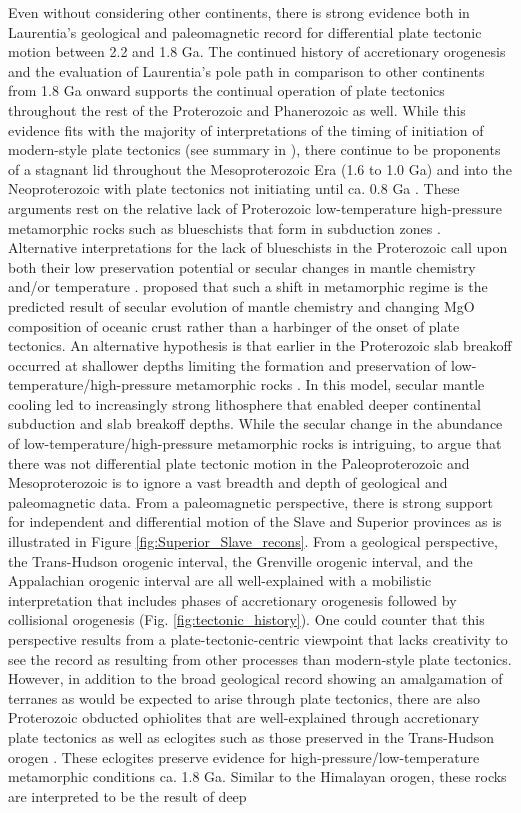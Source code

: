 \documentclass[twocolumn, switch]{article} %
\begin{document}
Even without considering other continents, there is strong evidence both in Laurentia's geological and paleomagnetic record for differential plate tectonic motion between 2.2 and 1.8 Ga. The continued history of accretionary orogenesis and the evaluation of Laurentia's pole path in comparison to other continents from 1.8 Ga onward supports the continual operation of plate tectonics throughout the rest of the Proterozoic and Phanerozoic as well. While this evidence fits with the majority of interpretations of the timing of initiation of modern-style plate tectonics (see summary in \citealp{Korenaga2013a}), there continue to be proponents of a stagnant lid throughout the Mesoproterozoic Era (1.6 to 1.0 Ga) and into the Neoproterozoic  with plate tectonics not initiating until ca. 0.8 Ga \citep{Hamilton2011a, Stern2018a}. These arguments rest on the relative lack of Proterozoic low-temperature high-pressure metamorphic rocks such as blueschists that form in subduction zones \citep{Stern2013a}. Alternative interpretations for the lack of blueschists in the Proterozoic call upon both their low preservation potential or secular changes in mantle chemistry and/or temperature \citep{Brown2019a}. \cite{Palin2015a} proposed that such a shift in metamorphic regime is the predicted result of secular evolution of mantle chemistry and changing MgO composition of oceanic crust rather than a harbinger of the onset of plate tectonics. An alternative hypothesis is that earlier in the Proterozoic slab breakoff occurred at shallower depths limiting the formation and preservation of low-temperature/high-pressure metamorphic rocks \citep{Brown2019a}. In this model, secular mantle cooling led to increasingly strong lithosphere that enabled deeper continental subduction and slab breakoff depths. While the secular change in the abundance of low-temperature/high-pressure metamorphic rocks is intriguing, to argue that there was not differential plate tectonic motion in the Paleoproterozoic and Mesoproterozoic is to ignore a vast breadth and depth of geological and paleomagnetic data. From a paleomagnetic perspective, there is strong support for independent and differential motion of the Slave and Superior provinces as is illustrated in Figure \ref{fig:Superior_Slave_recons}. From a geological perspective, the Trans-Hudson orogenic interval, the Grenville orogenic interval, and the Appalachian orogenic interval are all well-explained with a mobilistic interpretation that includes phases of accretionary orogenesis followed by collisional orogenesis (Fig. \ref{fig:tectonic_history}). One could counter that this perspective results from a plate-tectonic-centric viewpoint that lacks creativity to see the record as resulting from other processes than modern-style plate tectonics. However, in addition to the broad geological record showing an amalgamation of terranes as would be expected to arise through plate tectonics, there are also Proterozoic obducted ophiolites that are well-explained through accretionary plate tectonics as well as eclogites such as those preserved in the Trans-Hudson orogen \citep{Weller2017a}. These eclogites preserve evidence for high-pressure/low-temperature metamorphic conditions ca. 1.8 Ga. Similar to the Himalayan orogen, these rocks are interpreted to be the result of deep 
\end{document}
